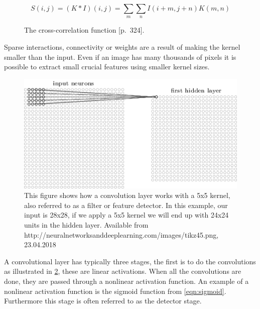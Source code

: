\begin{figure}[H]
    \begin{equation}
        S(i,j) = (K*I)(i,j) = \sum_{m} \sum_{n} I(i+m,j+n)K(m,n)
    \end{equation}
    \label{fig:cross_corr}
    \caption{The cross-correlation function \cite{goodfellow_deep_2016}[p.~324].}
\end{figure}

Sparse interactions, connectivity or weights are a result of making the kernel smaller than the input. Even if an image has many thousands of pixels it is possible to extract small crucial features using smaller kernel sizes.

\begin{figure}[H]
    \centering
    \includegraphics[width=\textwidth]{Assets/Chapter2_Theory/kernel_applied.png}
    \caption{\cite{nielsen_neural_2015} This figure shows how a convolution layer works with a 5x5 kernel, also referred to as a filter or feature detector. In this example, our input is 28x28, if we apply a 5x5 kernel we will end up with 24x24 units in the hidden layer. Available from http://neuralnetworksanddeeplearning.com/images/tikz45.png, 23.04.2018}
    \label{fig:kernel_applied}
\end{figure}

A convolutional layer has typically three stages, the first is to do the convolutions as illustrated in \ref{fig:kernel_applied}, these are linear activations. When all the convolutions are done, they are passed through a nonlinear activation function. An example of a nonlinear activation function is the sigmoid function from \ref{eqn:sigmoid}. Furthermore this stage is often referred to as the detector stage.

